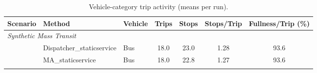 \begin{table}[h]
\centering
\caption{Vehicle-category trip activity (means per run).}
\label{tab:vehicle_type_trips}
\begin{tabular}{lllcccc}
\toprule
\textbf{Scenario} & \textbf{Method} & \textbf{Vehicle} & \textbf{Trips} & \textbf{Stops} & \textbf{Stops/Trip} & \textbf{Fullness/Trip (\%)} \\
\midrule
\multicolumn{7}{l}{\textit{Synthetic Mass Transit}} \\
 & Dispatcher_staticservice & Bus & 18.0 & 23.0 & 1.28 & 93.6 \\
 & MA_staticservice & Bus & 18.0 & 22.8 & 1.27 & 93.6 \\
\addlinespace
\bottomrule
\end{tabular}
\end{table}